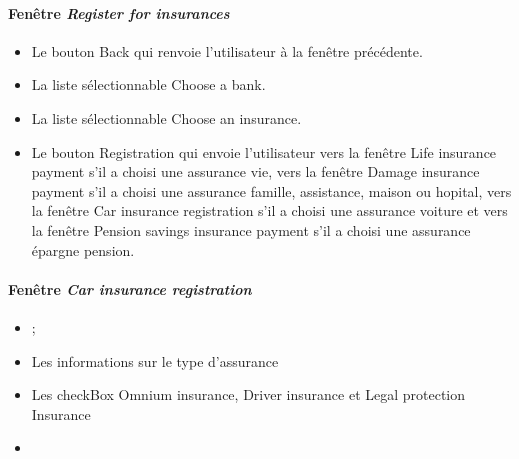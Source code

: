 \paragraph{Fenêtre \emph{Register for insurances}}
\begin{itemize}
\item Le bouton Back qui renvoie l'utilisateur à la fenêtre précédente.
\item La liste sélectionnable Choose a bank.
\item La liste sélectionnable Choose an insurance.
\item Le bouton Registration qui envoie l'utilisateur vers la fenêtre Life insurance payment s'il a choisi une assurance vie, vers la fenêtre Damage insurance payment s'il a choisi une assurance famille, assistance, maison ou hopital, vers la fenêtre Car insurance registration s'il a choisi une assurance voiture et vers la fenêtre Pension savings insurance payment s'il a choisi une assurance épargne pension.
\end{itemize}


\paragraph{Fenêtre \emph{Car insurance registration}}
\begin{itemize}
\item {} ;
\item Les informations sur le type d'assurance
\item Les checkBox Omnium insurance, Driver insurance et Legal protection Insurance
\item {}
\end{itemize}


